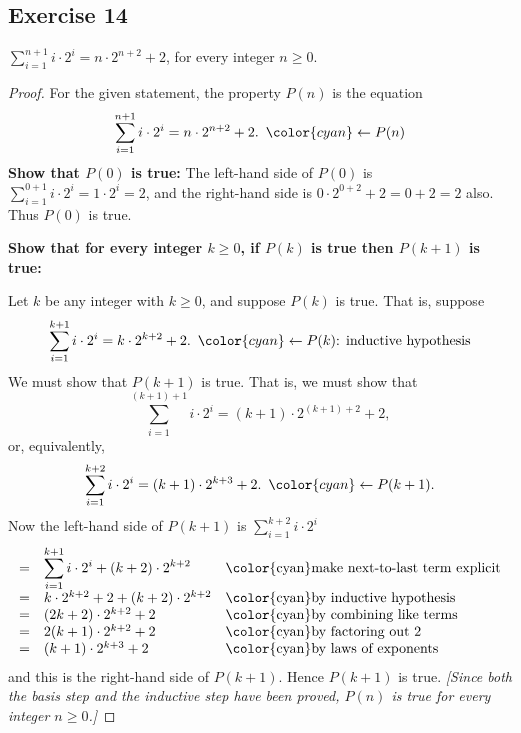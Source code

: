 \documentclass[14pt]{extarticle}
\newcommand{\dps}{\displaystyle}
\newcommand{\from}{\leftarrow}
\newcommand{\cy}{\color{cyan}}
\begin{document}
\subsection{Exercise 14}
$\dps \sum_{i=1}^{n+1}i \cdot 2^i = n \cdot 2^{n+2} + 2$, for every integer $n \geq 0$.

\begin{proof}
    For the given statement, the property $P(n)$ is the equation
    \[
        \dps \sum_{i=1}^{n+1}i \cdot 2^i = n \cdot 2^{n+2} + 2. \,\,\, {\cy \from P(n)}
    \]
    {\bf Show that $P(0)$ is true:} The left-hand side of $P(0)$ is $\dps \sum_{i=1}^{0+1}i \cdot 2^i = 1 \cdot 2^i = 2$, and the right-hand side is $0 \cdot 2^{0+2} + 2 = 0 + 2 = 2$ also. Thus $P(0)$ is true.

        {\bf Show that for every integer $k \geq 0$, if $P(k)$ is true then $P(k + 1)$ is true:}

    Let $k$ be any integer with $k \geq 0$, and suppose $P(k)$ is true. That is, suppose
    \[
        \dps \sum_{i=1}^{k+1}i \cdot 2^i = k \cdot 2^{k+2} + 2. \,\,\, {\cy \from P(k) \text{: inductive hypothesis}}
    \]
    We must show that $P(k + 1)$ is true. That is, we must show that
    \[
        \dps \sum_{i=1}^{(k+1)+1}i \cdot 2^i = (k+1) \cdot 2^{(k+1) +2} + 2,
    \]
    or, equivalently,
    \[
        \dps \sum_{i=1}^{k+2}i \cdot 2^i = (k+1) \cdot 2^{k+3} + 2. \,\,\,{\cy \from P(k+1)}.
    \]
    Now the left-hand side of $P(k + 1)$ is $\sum_{i=1}^{k+2}i \cdot 2^i$
    \[
        \begin{array}{lll}
            = & \dps \sum_{i=1}^{k+1}i \cdot 2^i + (k+2) \cdot 2^{k+2} & \text{\cy make next-to-last term explicit} \\
            = & k \cdot 2^{k+2} + 2 + (k+2) \cdot 2^{k+2}              & \text{\cy by inductive hypothesis}         \\
            = & (2k+2) \cdot 2^{k+2} + 2                               & \text{\cy by combining like terms}         \\
            = & 2(k+1) \cdot 2^{k+2} + 2                               & \text{\cy by factoring out 2}              \\
            = & (k+1) \cdot 2^{k+3} + 2                                & \text{\cy by laws of exponents}
        \end{array}
    \]
    and this is the right-hand side of $P(k + 1)$. Hence $P(k + 1)$ is true. {\it [Since both the basis step and the inductive step have been proved, $P(n)$ is true for every integer $n \geq 0$.]}
\end{proof}
\end{document}
